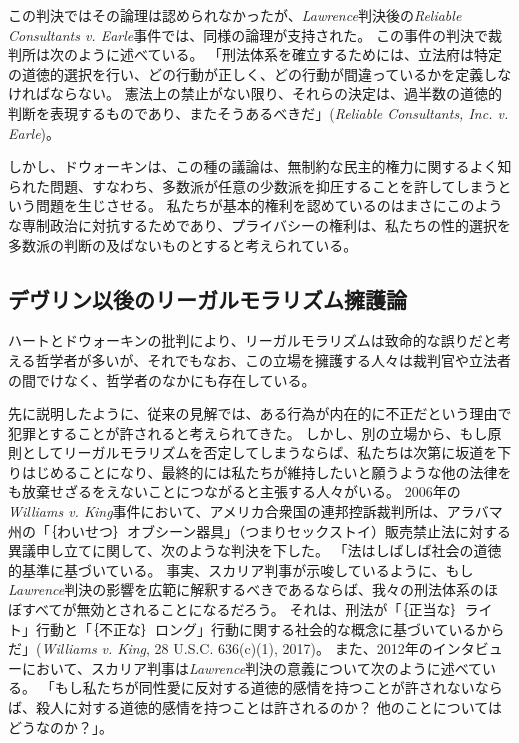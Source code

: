 \documentclass[paper=a4,book,openany]{jlreq}
\newcommand{\ig}[1]{}           %
\begin{document}
この判決ではその論理は認められなかったが、\emph{Lawrence}判決後の\emph{Reliable Consultants v. Earle}事件では、同様の論理が支持された。
この事件の判決で裁判所は次のように述べている。
「刑法体系を確立するためには、立法府は特定の道徳的選択を行い、どの行動が正しく、どの行動が間違っているかを定義しなければならない。
憲法上の禁止がない限り、それらの決定は、過半数の道徳的判断を表現するものであり、またそうあるべきだ」(\emph{Reliable Consultants, Inc. v. Earle}\ig{, 517 F.3d 738, 2008})。

しかし、ドウォーキン\ig{Ronald Dworkin}は、この種の議論は、無制約な民主的権力に関するよく知られた問題、すなわち、多数派が任意の少数派を抑圧することを許してしまうという問題を生じさせる。
私たちが基本的権利を認めているのはまさにこのような専制政治に対抗するためであり、プライバシーの権利は、私たちの性的選択を多数派の判断の及ばないものとすると考えられている。

\subsection{デヴリン以後のリーガルモラリズム擁護論}

ハートとドウォーキン\ig{Ronald Dworkin}の批判により、リーガルモラリズムは致命的な誤りだと考える哲学者が多いが、それでもなお、この立場を擁護する人々は裁判官や立法者の間でけなく、哲学者のなかにも存在している。

先に説明したように、従来の見解では、ある行為が内在的に不正だという理由で犯罪とすることが許されると考えられてきた。
しかし、別の立場から、もし原則としてリーガルモラリズムを否定してしまうならば、私たちは次第に坂道を下りはじめることになり、最終的には私たちが維持したいと願うような他の法律をも放棄せざるをえないことにつながると主張する人々がいる。
2006年の\emph{Williams v. King}事件において、アメリカ合衆国の連邦控訴裁判所は、アラバマ州の「｛わいせつ｝{オブシーン}器具」（つまりセックストイ）販売禁止法に対する異議申し立てに関して、次のような判決を下した。
「法はしばしば社会の道徳的基準に基づいている。
事実、スカリア判事が示唆しているように、もし\emph{Lawrence}判決の影響を広範に解釈するべきであるならば、我々の刑法体系のほぼすべてが無効とされることになるだろう。
それは、刑法が「｛正当な｝{ライト}」行動と「｛不正な｝{ロング}」行動に関する社会的な概念に基づいているからだ」(\emph{Williams v. King}, 28 U.S.C. 636(c)(1), 2017)。
また、2012年のインタビューにおいて、スカリア判事は\emph{Lawrence}判決の意義について次のように述べている。
「もし私たちが同性愛に反対する道徳的感情を持つことが許されないならば、殺人に対する道徳的感情を持つことは許されるのか？ 他のことについてはどうなのか？」\citep{sink12:_justic_scalia_defen_compar_laws_homos_murder}。
\end{document}
